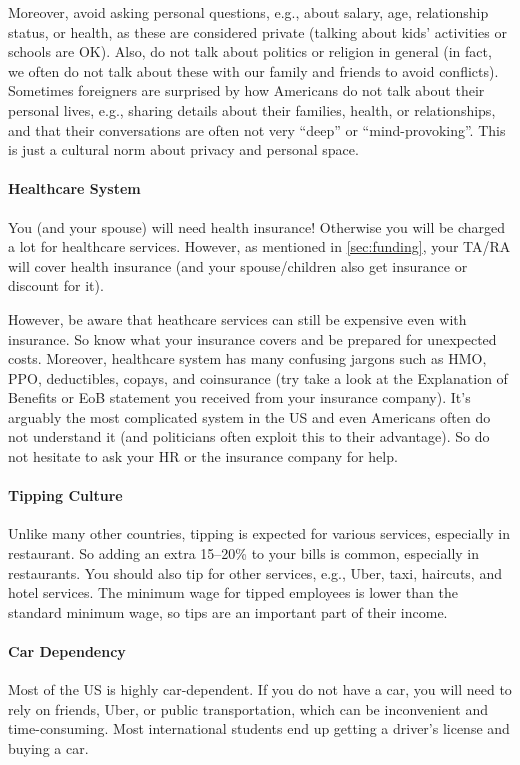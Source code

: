 \documentclass[oneside,11pt,dvipsnames]{book}
\begin{document}
  Moreover, avoid asking personal questions, e.g., about salary, age, relationship status, or health, as these are considered private (talking about kids' activities or schools are OK). Also, do not talk about politics or religion in general (in fact, we often do not talk about these with our family and friends to avoid conflicts).  Sometimes foreigners are surprised by how Americans do not talk about their personal lives, e.g., sharing details about their families, health, or relationships, and that their conversations are often not very ``deep'' or ``mind-provoking''. This is just a cultural norm about privacy and personal space.

  \paragraph{Healthcare System}  You (and your spouse) will need health insurance! Otherwise you will be charged a lot for healthcare services. However, as mentioned in \autoref{sec:funding}, your  TA/RA  will cover health insurance (and your spouse/children also get insurance or discount for it). 
  
  However, be aware that heathcare services can still be expensive even with insurance. So  know what your insurance covers and be prepared for unexpected costs.  Moreover, healthcare system has many confusing jargons such as HMO, PPO, deductibles, copays, and coinsurance (try take a look at the Explanation of Benefits or EoB statement you received from your insurance company). It's arguably the most complicated system in the US and even Americans often do not understand it (and politicians often exploit this to their advantage).  So do not hesitate to ask your HR or the insurance company for help.
  
  
  \paragraph{Tipping Culture} Unlike many other countries, tipping is expected for various services, especially in restaurant. So adding an extra 15--20\% to your bills is common, especially in restaurants.
  You should also tip for other services, e.g., Uber, taxi, haircuts, and hotel services.  The minimum wage for tipped employees is lower than the standard minimum wage, so tips are an important part of their income.

  \paragraph{Car Dependency} Most of the US is highly car-dependent. If you do not have a car, you will need to rely on friends, Uber, or public transportation, which can be inconvenient and time-consuming. Most international students end up getting a driver's license and buying a car.
\end{document}
